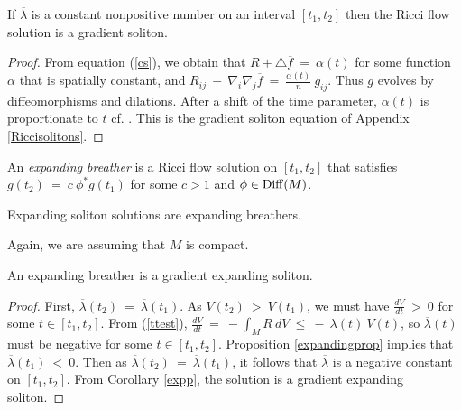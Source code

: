 \begin{corollary}
  \label{cor:kl-rescaled-invariant-rigidity-at-constant-rescaled-lambda}
 \label{expp}
If $\overline{\lambda}$ is a
constant nonpositive number on an interval $[t_1, t_2]$ then the
Ricci flow solution is a
gradient soliton.
\end{corollary}
\begin{proof}
From equation (\ref{cs}), we obtain that $R + \triangle \overline{f} \: = \: \alpha(t)$ for some
function $\alpha$ that is spatially constant, and
$R_{ij} \: + \: \nabla_i \nabla_j \overline{f} \: = \: \frac{\alpha(t)}{n} \: g_{ij}$.
Thus $g$ evolves by diffeomorphisms and dilations.
After a shift of the time parameter,
$\alpha(t)$ is proportionate to $t$
cf. \cite[Lemma 2.4]{Chow-Knopf}.
This is the gradient soliton equation of Appendix \ref{Riccisolitons}.
\end{proof}

\begin{definition}
  \label{def:kl-rescaled-invariant-expanding-breather-definition}

An {\em expanding breather} is a Ricci flow solution on $[t_1, t_2]$ that
satisfies $g(t_2) \: = \: c \: \phi^* g(t_1)$ for some
$c > 1$ and $\phi \in \operatorname{Diff}(M)$.
\end{definition}

Expanding soliton solutions are
expanding breathers.

Again, we are assuming that $M$ is
compact.

\begin{proposition}
  \label{prop:kl-rescaled-invariant-rigidity-expanding-breathers}

An expanding breather is a gradient expanding soliton.
\end{proposition}
\begin{proof}
First, $\overline{\lambda}(t_2) \: = \: \overline{\lambda}(t_1)$.
As $V(t_2) \: > \: V(t_1)$, we must have
$\frac{dV}{dt} \: > \: 0$ for some $t \in [t_1, t_2]$.
From (\ref{ttest}), $\frac{dV}{dt} \: = \:
-  \int_M R \: dV \: \le \: - \: \lambda(t) \: V(t)$, so
$\overline{\lambda}(t)$ must be negative for some
$t \in [t_1, t_2]$.
Proposition \ref{expandingprop} implies that
$\overline{\lambda}(t_1) \: < \: 0$. Then as
$\overline{\lambda}(t_2) \: = \: \overline{\lambda}(t_1)$,
it follows that $\overline{\lambda}$ is a negative
constant on $[t_1, t_2]$. From Corollary \ref{expp}, the solution is a gradient expanding
soliton.
\end{proof}

